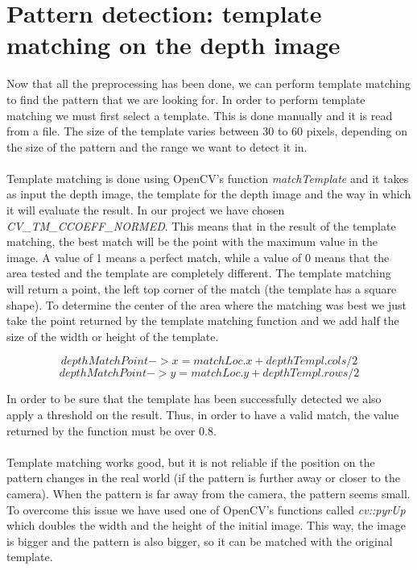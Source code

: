 \section{Pattern detection: template matching on the depth image}
\noindent
Now that all the preprocessing has been done, we can perform template matching to find the pattern that we are looking for. In order to perform template matching we must first select a template. This is done manually and it is read from a file. The size of the template varies between 30 to 60 pixels, depending on the size of the pattern and the range we want to detect it in. 
\\\\
Template matching is done using OpenCV's function \emph{matchTemplate} and it takes as input the depth image, the template for the depth image and the way in which it will evaluate the result. In our project we have chosen \emph{CV\_TM\_CCOEFF\_NORMED}. This means that in the result of the template matching, the best match will be the point with the maximum value in the image. A value of 1 means a perfect match, while a value of 0 means that the area tested and the template are completely different. 
The template matching will return a point, the left top corner of the match (the template has a square shape). To determine the center of the area where the matching was best we just take the point returned by the template matching function and we add half the size of the width or height of the template. 

$$ depthMatchPoint->x = matchLoc.x + depthTempl.cols/2 $$
$$ depthMatchPoint->y = matchLoc.y + depthTempl.rows/2 $$

\noindent
In order to be sure that the template has been successfully detected we also apply a threshold on the result. Thus, in order to have a valid match, the value returned by the function must be over $0.8$. 
\\\\
Template matching works good, but it is not reliable if the position on the pattern changes in the real world (if the pattern is further away or closer to the camera). When the pattern is far away from the camera, the pattern seems small. To overcome this issue we have used one of OpenCV's functions called \emph{cv::pyrUp} which doubles the width and the height of the initial image. This way, the image is bigger and the pattern is also bigger, so it can be matched with the original template. 

